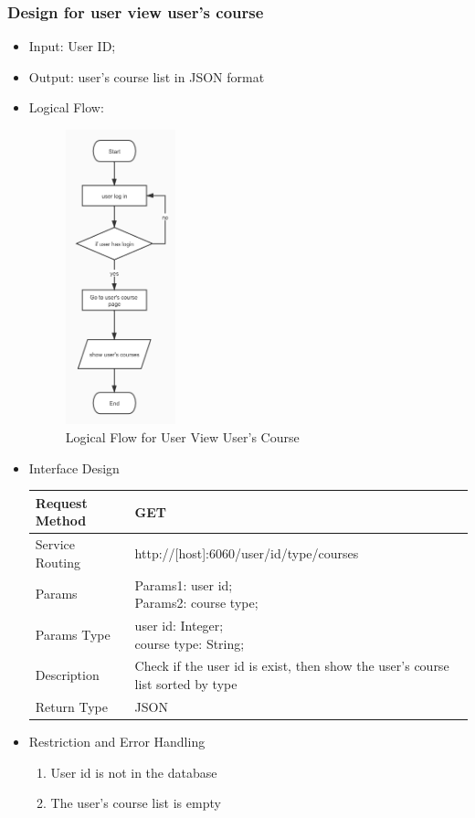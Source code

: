 \documentclass[16pt]{scrreprt}
\begin{document}
\subsubsection{Design for user view user's course}
\begin{itemize}
	\item Input: User ID; 
	\item Output: user's course list in JSON format
	\item Logical Flow:
	 \begin{figure}[H]
	\centering
	\includegraphics[width=0.3\textwidth]{diagrams/mycourse.jpg}
	\caption{Logical Flow for User View User's Course}
\end{figure}
	\item Interface Design
	\begin{center}
    \begin{tabular}{p{5cm}p{10cm}}
        \hline
	    Request Method & GET\\
        \hline
	    Service Routing &  http://[host]:6060/user/{id}/{type}/courses\\
        \hline
	    Params & \makecell[l]{Params1: user id;\\ Params2: course type;}\\ 
        \hline
        Params Type & \makecell[l]{user id: Integer;\\course type: String;}\\
        \hline
        Description & Check if the user id is exist, then show the user's course list sorted by type\\
        \hline
        Return Type & JSON\\
        \hline
    \end{tabular}
\end{center}
\item Restriction and Error Handling\\
\begin{enumerate}
	\item User id is not in the database
	\item The user's course list is empty
\end{enumerate} 
\end{itemize}
\end{document}
